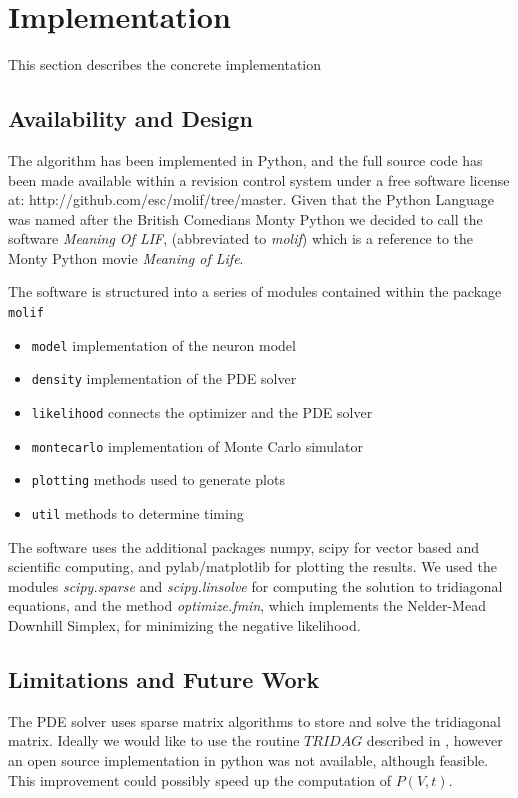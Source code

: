 \documentclass[10pt]{article}
\begin{document}
\section{Implementation}

This section describes the concrete implementation

\subsection{Availability and Design}

The algorithm has been implemented in Python, and the full source code
has been made available within a revision control system under a free
software license at: http://github.com/esc/molif/tree/master. Given
that the Python Language was named after the British Comedians Monty
Python we decided to call the software {\it Meaning Of LIF},
(abbreviated to {\it molif}) which is a reference to the Monty Python
movie {\it Meaning of Life}. 

The software is structured into a series of modules contained within
the package {\tt molif} 

\begin{itemize}
    \item {\tt model} implementation of the neuron model
    \item {\tt density} implementation of the PDE solver 
    \item {\tt likelihood} connects the optimizer and the PDE solver
    \item {\tt montecarlo} implementation of Monte Carlo simulator
    \item {\tt plotting} methods used to generate plots
    \item {\tt util} methods to determine timing
\end{itemize}

The software uses the additional packages numpy, scipy for vector
based and scientific computing, and pylab/matplotlib for plotting the
results. We used the modules {\it scipy.sparse} and {\it
scipy.linsolve} for computing the solution to tridiagonal equations, and the
method {\it optimize.fmin}, which implements the Nelder-Mead Downhill
Simplex, for minimizing the negative likelihood.


\subsection{Limitations and Future Work}

The PDE solver uses sparse matrix algorithms to store and solve the
tridiagonal matrix. Ideally we would like to use the routine $TRIDAG$
described in \cite{press}, however an open source implementation in
python was not available, although feasible. This improvement could
possibly speed up the computation of $P(V,t)$.
\end{document}
